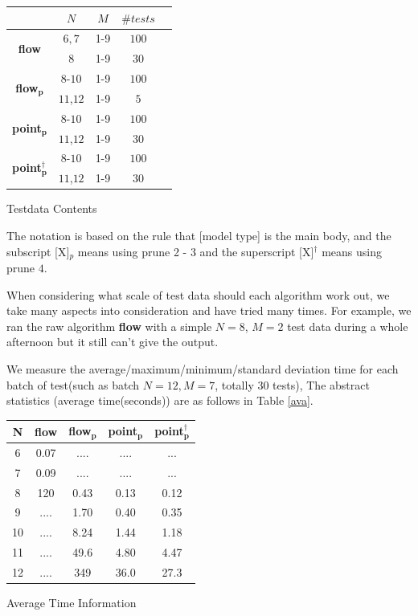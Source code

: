 \documentclass[twocolumn]{article}
\begin{document}
\begin{center}
\makeatletter
\def\@captype{table}
\begin{tabular}{|c|c|c|c|c|}
\hline
 & $N$ & $M$ & $\# tests$ \\
\hline
\multirow{2}{*}{\textbf{flow}} & $6,7$ & 1-9 & $100$\\
\cline{2-4}
 & $8$ & 1-9 & $30$\\
\hline
\multirow{2}{*}{\textbf{flow$\bm{_p}$}} & $8$-$10$ & 1-9 & $100$\\
\cline{2-4}
 & $11$,$12$ & 1-9 & $5$\\
\hline
\multirow{2}{*}{\textbf{point$\bm{_p}$}} & $8$-$10$ & 1-9 & $100$\\
\cline{2-4}
 & $11$,$12$ & 1-9 & $30$\\
\hline
\multirow{2}{*}{\textbf{point$\bm{_p^\dagger}$}} & $8$-$10$ & 1-9 & $100$\\
\cline{2-4}
 & $11$,$12$ & 1-9 & $30$\\
\hline
\end{tabular}
\caption{Testdata Contents}
\label{tc}
\end{center}

The notation is based on the rule that [model type] is the main body, and the subscript [X]$_p$ means using prune 2 - 3 and the superscript [X]$^\dagger$ means using prune $4$.

When considering what scale of test data should each algorithm work out, we take many aspects into consideration and have tried many times. For example, we ran the raw algorithm \textbf{flow} with a simple $N = 8$, $M = 2$ test data during a whole afternoon but it still can't give the output.

We measure the average/maximum/minimum/standard deviation time for each batch of test(such as batch $N = 12, M = 7$, totally $30$ tests), The abstract statistics (average time(seconds)) are as follows in Table \ref{ava}.

\begin{center}
\makeatletter
\def\@captype{table}
\begin{tabular}{|c|c|c|c|c|}
\hline
N & \textbf{flow} & \textbf{flow$\bm{_p}$} & \textbf{point$\bm{_p}$} & \textbf{point$\bm{_p^\dagger}$} \\
\hline
6 & 0.07 & .... & .... & ...\\
\hline
7 & 0.09 & .... & .... & ...\\
\hline
8 & 120 & 0.43 & 0.13 & 0.12\\
\hline
9 & .... & 1.70 & 0.40 & 0.35\\
\hline
10 & .... & 8.24 & 1.44 & 1.18\\
\hline
11 & .... & 49.6 & 4.80 & 4.47\\
\hline
12 & .... & 349 & 36.0 & 27.3\\
\hline
\end{tabular}
\caption{Average Time Information}
\label{ava}
\end{center}
\end{document}
